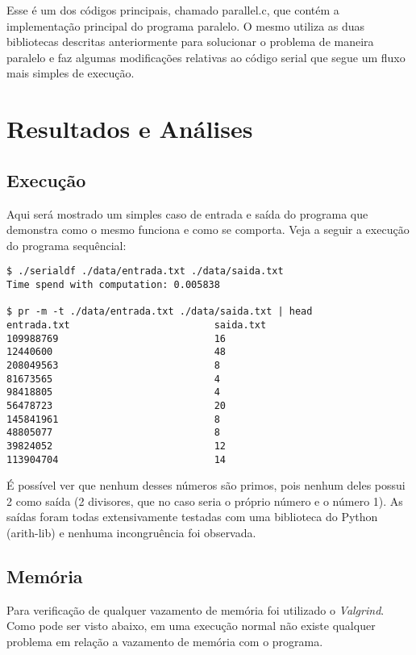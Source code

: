 \documentclass{article}
\begin{document}
Esse é um dos códigos principais, chamado parallel.c, que contém a implementação principal do programa paralelo. O mesmo utiliza as duas bibliotecas descritas anteriormente para solucionar o problema de maneira paralelo e faz algumas modificações relativas ao código serial que segue um fluxo mais simples de execução.

\section{Resultados e Análises}
\subsection{Execução}

Aqui será mostrado um simples caso de entrada e saída do programa que demonstra como o mesmo funciona e como se comporta. Veja a seguir a execução do programa sequêncial:

\begin{verbatim}
$ ./serialdf ./data/entrada.txt ./data/saida.txt  
Time spend with computation: 0.005838

$ pr -m -t ./data/entrada.txt ./data/saida.txt | head
entrada.txt                         saida.txt
109988769                           16
12440600                            48
208049563                           8
81673565                            4
98418805                            4
56478723                            20
145841961                           8
48805077                            8
39824052                            12
113904704                           14
\end{verbatim}

É possível ver que nenhum desses números são primos, pois nenhum deles possui 2 como saída (2 divisores, que no caso seria o próprio número e o número 1). As saídas foram todas extensivamente testadas com uma biblioteca do Python (arith-lib) e nenhuma incongruência foi observada.

\subsection{Memória}

Para verificação de qualquer vazamento de memória foi utilizado o \textit{Valgrind}. Como pode ser visto abaixo, em uma execução normal não existe qualquer problema em relação a vazamento de memória com o programa.
\end{document}
